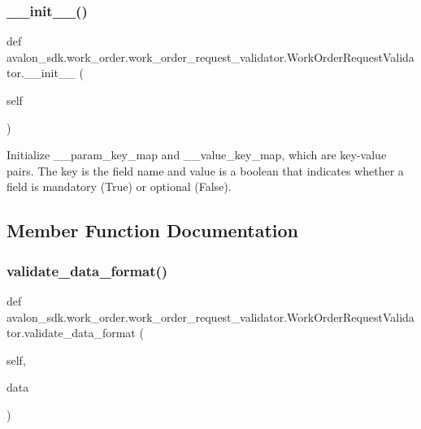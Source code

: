 \subsubsection{\texorpdfstring{\+\_\+\+\_\+init\+\_\+\+\_\+()}{\_\_init\_\_()}}
{\footnotesize\ttfamily def avalon\+\_\+sdk.\+work\+\_\+order.\+work\+\_\+order\+\_\+request\+\_\+validator.\+Work\+Order\+Request\+Validator.\+\_\+\+\_\+init\+\_\+\+\_\+ (\begin{DoxyParamCaption}\item[{}]{self }\end{DoxyParamCaption})}

\begin{DoxyVerb}Initialize __param_key_map and __value_key_map,
which are key-value pairs.
The key is the field name and value is a boolean that
indicates whether a field is mandatory (True) or optional (False).
\end{DoxyVerb}
 

\subsection{Member Function Documentation}
\mbox{\label{classavalon__sdk_1_1work__order_1_1work__order__request__validator_1_1WorkOrderRequestValidator_a6cb47d2ff9acfbc7694055626a504194}} 
\subsubsection{\texorpdfstring{validate\+\_\+data\+\_\+format()}{validate\_data\_format()}}
{\footnotesize\ttfamily def avalon\+\_\+sdk.\+work\+\_\+order.\+work\+\_\+order\+\_\+request\+\_\+validator.\+Work\+Order\+Request\+Validator.\+validate\+\_\+data\+\_\+format (\begin{DoxyParamCaption}\item[{}]{self,  }\item[{}]{data }\end{DoxyParamCaption})}

